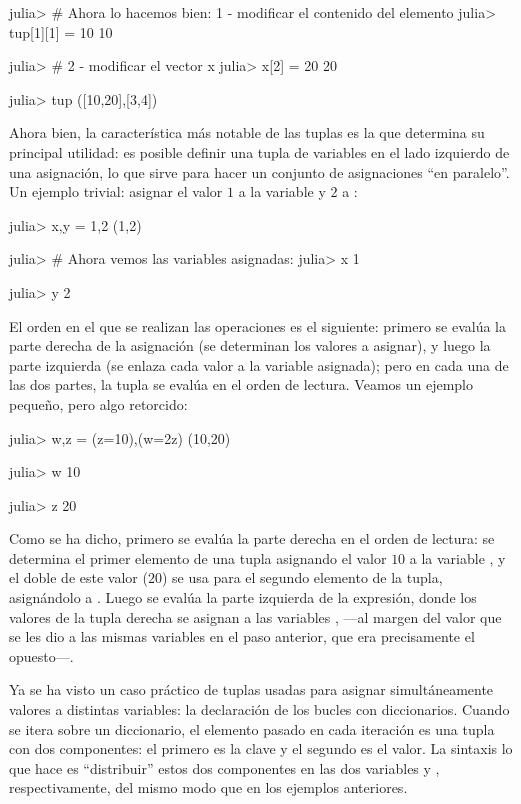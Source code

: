 {\begin{jlconcode}
julia> # Ahora lo hacemos bien: 1 - modificar el contenido del elemento
julia> tup[1][1] = 10
10

julia> # 2 - modificar el vector x
julia> x[2] = 20
20

julia> tup
([10,20],[3,4])
\end{jlconcode}

Ahora bien, la característica más notable de las tuplas es la que determina su principal utilidad: es posible definir una tupla de variables en el lado izquierdo de una asignación, lo que sirve para hacer un conjunto de asignaciones ``en paralelo''. Un ejemplo trivial: asignar el valor $1$ a la variable  y $2$ a :

\begin{jlconcode}
julia> x,y = 1,2
(1,2)

julia> # Ahora vemos las variables asignadas:
julia> x
1

julia> y
2
\end{jlconcode}

El orden en el que se realizan las operaciones es el siguiente: primero se evalúa la parte derecha de la asignación (se determinan los valores a asignar), y luego la parte izquierda (se enlaza cada valor a la variable asignada); pero en cada una de las dos partes, la tupla se evalúa en el orden de lectura. Veamos un ejemplo pequeño, pero algo retorcido:

\begin{jlconcode}
julia> w,z = (z=10),(w=2z)
(10,20)

julia> w
10

julia> z
20
\end{jlconcode}

Como se ha dicho, primero se evalúa la parte derecha en el orden de lectura: se determina el primer elemento de una tupla asignando el valor $10$ a la variable , y el doble de este valor ($20$) se usa para el segundo elemento de la tupla, asignándolo a . Luego se evalúa la parte izquierda de la expresión, donde los valores de la tupla derecha se asignan a las variables ,  ---al margen del valor que se les dio a las mismas variables en el paso anterior, que era precisamente el opuesto---.

Ya se ha visto un caso práctico de tuplas usadas para asignar simultáneamente valores a distintas variables: la declaración de los bucles  con diccionarios. Cuando se itera sobre un diccionario, el elemento pasado en cada iteración es una tupla con dos componentes: el primero es la clave y el segundo es el valor. La sintaxis  lo que hace es ``distribuir'' estos dos componentes en las dos variables  y , respectivamente, del mismo modo que en los ejemplos anteriores.

}
